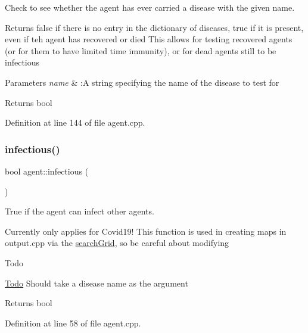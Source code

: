 Check to see whether the agent has ever carried a disease with the given name. 

Returns false if there is no entry in the dictionary of diseases, true if it is present, even if teh agent has recovered or died This allows for testing recovered agents (or for them to have limited time immunity), or for dead agents still to be infectious


\begin{DoxyParams}{Parameters}
{\em name} & \+:A string specifying the name of the disease to test for \\
\hline
\end{DoxyParams}
\begin{DoxyReturn}{Returns}
bool 
\end{DoxyReturn}


Definition at line 144 of file agent.\+cpp.

\mbox{\label{classagent_ae186a297218e835ac064bf7a329d5b42}} 
\subsubsection{\texorpdfstring{infectious()}{infectious()}}
{\footnotesize\ttfamily bool agent\+::infectious (\begin{DoxyParamCaption}{ }\end{DoxyParamCaption})}



True if the agent can infect other agents. 

Currently only applies for Covid19! This function is used in creating maps in output.\+cpp via the \mbox{\hyperlink{classsearchGrid}{search\+Grid}}, so be careful about modifying \begin{DoxyRefDesc}{Todo}
\item[\mbox{\hyperlink{todo__todo000001}{Todo}}]Should take a disease name as the argument\end{DoxyRefDesc}


\begin{DoxyReturn}{Returns}
bool 
\end{DoxyReturn}


Definition at line 58 of file agent.\+cpp.

\mbox{\label{classagent_ac55fabf889e49a48c055c9c495062d5e}} 
